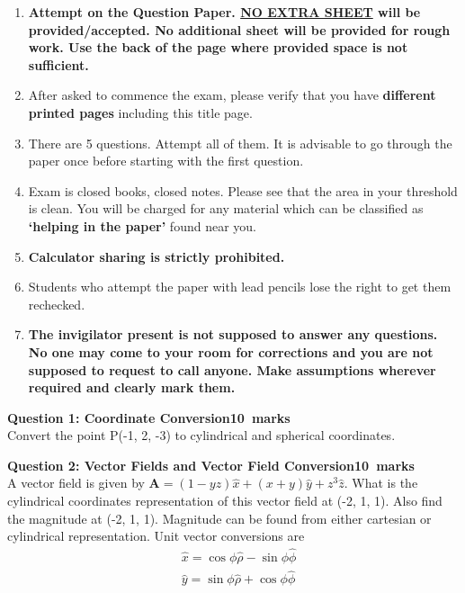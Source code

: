 \documentclass[12pt,a4paper]{article}
\def\QOne{10}
\def\Qtwo{10}
\begin{document}
\begin{enumerate}
\item \textbf{Attempt on the Question Paper. \underline{NO EXTRA SHEET} will be provided/accepted. No
additional sheet will be provided for rough work. Use the back of the page where
provided space is not sufficient.}
\item After asked to commence the exam, please verify that you have \textbf{\pageref{LastPage} different
printed pages} including this title page.
\item There are 5 questions. Attempt all of them. It is advisable to go through the paper once
before starting with the first question.
\item Exam is closed books, closed notes. Please see that the area in your threshold is clean.
You will be charged for any material which can be classified as \textbf{`helping in the paper'}
found near you.
\item \textbf{Calculator sharing is strictly prohibited.}
\item Students who attempt the paper with lead pencils lose the right to get them rechecked.
\item \textbf{The invigilator present is not supposed to answer any questions. No one may come
to your room for corrections and you are not supposed to request to call anyone.
Make assumptions wherever required and clearly mark them.}
\end{enumerate}
\newpage
\noindent\textbf{Question 1: Coordinate Conversion\hfill \QOne~marks}\\
Convert the point P(-1, 2, -3) to cylindrical and spherical coordinates.
\newpage

\noindent \textbf{Question 2: Vector Fields and Vector Field Conversion\hfill \Qtwo~marks}\\
A vector field is given by $\textbf{A}=(1-yz)\hat x+(x+y)\hat y+z^3\hat z$. What is the cylindrical coordinates representation of this vector field at (-2, 1, 1). Also find the magnitude at (-2, 1, 1). Magnitude can be found from either cartesian or cylindrical representation. Unit vector conversions are
\begin{equation*}
\begin{split}
&\hat x=\cos\phi\hat \rho-\sin\phi \hat \phi\\
&\hat y=\sin\phi\hat \rho+\cos\phi \hat \phi\\
\end{split}
\end{equation*}
\newpage
\end{document}
